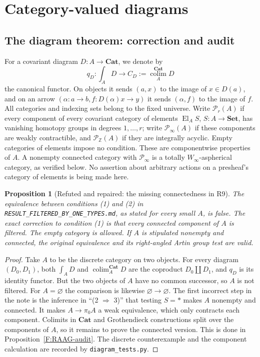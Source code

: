 \documentclass[11pt,a4paper]{article}
\newtheorem{proposition}[theorem]{Proposition}
\theoremstyle{definition}
\theoremstyle{remark}
\newcommand{\Cat}{\mathbf{Cat}}
\newcommand{\Set}{\mathbf{Set}}
\newcommand{\Winfty}{W_\infty}
\newcommand{\El}{\operatorname{El}}
\newcommand{\colim}{\operatorname*{colim}}
\begin{document}

\section{Category-valued diagrams}

\subsection{The diagram theorem: correction and audit}

For a covariant diagram $D:A\to\Cat$, we denote by
\[
 q_D:\int_A D\longrightarrow C_D:=\colim_A^{\Cat}D
\]
the canonical functor.  On objects it sends $(a,x)$ to the image of
$x\in D(a)$, and on an arrow $(\alpha:a\to b,
f:D(\alpha)x\to y)$ it sends $(\alpha,f)$ to the image of $f$.
All categories and indexing sets belong to the fixed universe.  Write
$\mathcal P_r(A)$ if every component of every covariant category of
elements $\El_A S$, $S:A\to\Set$, has vanishing homotopy groups in
degrees $1,\ldots,r$; write $\mathcal P_\infty(A)$ if these components
are weakly contractible, and $\mathcal P_{\mathbb Z}(A)$ if they are
integrally acyclic.  Empty categories of elements impose no condition.
These are componentwise properties of $A$.  A nonempty connected
category with $\mathcal P_\infty$ is a totally $\Winfty$-aspherical
category, as verified below.  No assertion about arbitrary actions on
a presheaf's category of elements is being made here.

\begin{proposition}[Refuted and repaired: the missing connectedness in R9]
\label{F:R9-correction}
The equivalence between conditions (1) and (2) in
\texttt{RESULT\_FILTERED\_BY\_ONE\_TYPES.md}, as stated for every small
$A$, is false.  The exact correction to condition (1) is that every
connected component of $A$ is filtered.  The empty category is allowed.
If $A$ is stipulated nonempty and connected, the original equivalence
and its right-angled Artin group test are valid.
\end{proposition}
\begin{proof}
Take $A$ to be the discrete category on two objects.  For every diagram
$(D_0,D_1)$, both $\int_A D$ and $\colim_A^{\Cat}D$ are the coproduct
$D_0\amalg D_1$, and $q_D$ is its identity functor.  But the two objects
of $A$ have no common successor, so $A$ is not filtered.  For $A=\varnothing$
the comparison is likewise $\varnothing\to\varnothing$.
The first incorrect step in the note is the inference in
``(2 $\Rightarrow$ 3)'' that testing $S=*$ makes $A$ nonempty and
connected.  It makes $A\to\pi_0A$ a weak equivalence, which only
contracts each component.  Colimits in $\Cat$ and Grothendieck
constructions split over the components of $A$, so it remains to prove
the connected version.  This is done in
Proposition~\ref{F:RAAG-audit}.  The discrete counterexample and the
component calculation are recorded by \texttt{diagram\_tests.py}.
\end{proof}
\end{document}
